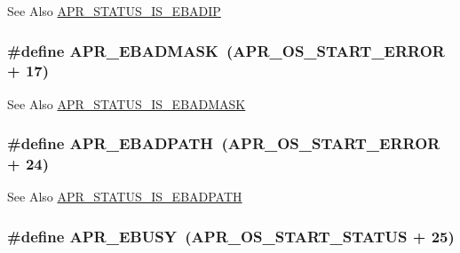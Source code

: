 \begin{DoxySeeAlso}{See Also}
\hyperlink{group___a_p_r___s_t_a_t_u_s___i_s_ga02d9309a113e07050308af66e955d600}{A\-P\-R\-\_\-\-S\-T\-A\-T\-U\-S\-\_\-\-I\-S\-\_\-\-E\-B\-A\-D\-I\-P} 
\end{DoxySeeAlso}
\hypertarget{group___a_p_r___error_ga5249b5edc27466f6b60b3dfa1541ba31}{
\subsubsection[{A\-P\-R\-\_\-\-E\-B\-A\-D\-M\-A\-S\-K}]{\setlength{\rightskip}{0pt plus 5cm}\#define A\-P\-R\-\_\-\-E\-B\-A\-D\-M\-A\-S\-K~({\bf A\-P\-R\-\_\-\-O\-S\-\_\-\-S\-T\-A\-R\-T\-\_\-\-E\-R\-R\-O\-R} + 17)}}\label{group___a_p_r___error_ga5249b5edc27466f6b60b3dfa1541ba31}
\begin{DoxySeeAlso}{See Also}
\hyperlink{group___a_p_r___s_t_a_t_u_s___i_s_gabec95c93d0c5996f14a94e2cc37e1904}{A\-P\-R\-\_\-\-S\-T\-A\-T\-U\-S\-\_\-\-I\-S\-\_\-\-E\-B\-A\-D\-M\-A\-S\-K} 
\end{DoxySeeAlso}
\hypertarget{group___a_p_r___error_ga1731292eb3e3cdc801d3bf0b09cd8da7}{
\subsubsection[{A\-P\-R\-\_\-\-E\-B\-A\-D\-P\-A\-T\-H}]{\setlength{\rightskip}{0pt plus 5cm}\#define A\-P\-R\-\_\-\-E\-B\-A\-D\-P\-A\-T\-H~({\bf A\-P\-R\-\_\-\-O\-S\-\_\-\-S\-T\-A\-R\-T\-\_\-\-E\-R\-R\-O\-R} + 24)}}\label{group___a_p_r___error_ga1731292eb3e3cdc801d3bf0b09cd8da7}
\begin{DoxySeeAlso}{See Also}
\hyperlink{group___a_p_r___s_t_a_t_u_s___i_s_ga0758d7227209e4311c843c752c0dd075}{A\-P\-R\-\_\-\-S\-T\-A\-T\-U\-S\-\_\-\-I\-S\-\_\-\-E\-B\-A\-D\-P\-A\-T\-H} 
\end{DoxySeeAlso}
\hypertarget{group___a_p_r___error_gab6e5bc99dbace4a91d8d0adcbd8fd66b}{
\subsubsection[{A\-P\-R\-\_\-\-E\-B\-U\-S\-Y}]{\setlength{\rightskip}{0pt plus 5cm}\#define A\-P\-R\-\_\-\-E\-B\-U\-S\-Y~({\bf A\-P\-R\-\_\-\-O\-S\-\_\-\-S\-T\-A\-R\-T\-\_\-\-S\-T\-A\-T\-U\-S} + 25)}}\label{group___a_p_r___error_gab6e5bc99dbace4a91d8d0adcbd8fd66b}
